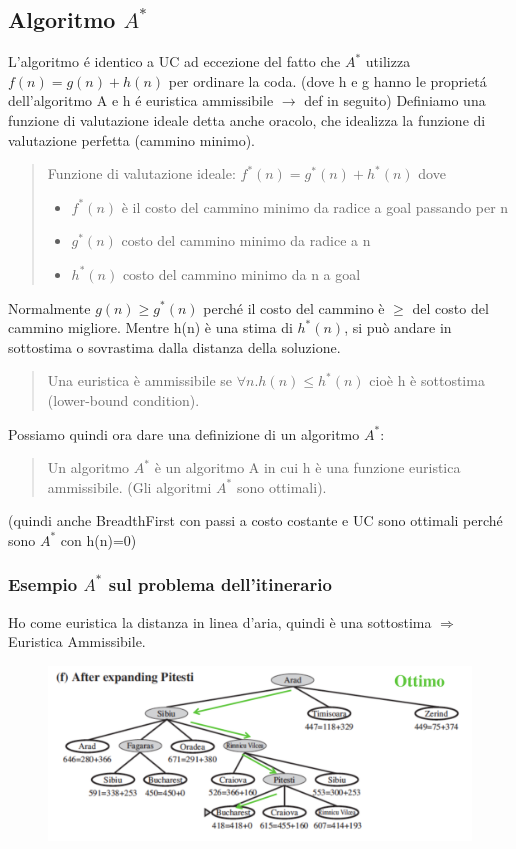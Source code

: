 \documentclass{article}
\begin{document}
\subsection{Algoritmo $A^*$}
L'algoritmo é identico a UC ad eccezione del fatto che $A^*$ utilizza $f(n)=g(n)+h(n)$ per ordinare la coda. (dove h e g hanno le proprietá dell'algoritmo A e h é euristica ammissibile $\rightarrow$ def in seguito)\newline
Definiamo una funzione di valutazione ideale detta anche oracolo, che idealizza la funzione di valutazione perfetta (cammino minimo).
\begin{quote}
    Funzione di valutazione ideale: $f^*(n) = g^*(n)+h^*(n)$ dove
    \begin{itemize}
        \item $f^*(n)$ è il costo del cammino minimo da radice a goal passando per n
        \item $g^*(n)$ costo del cammino minimo da radice a n
        \item $h^*(n)$ costo del cammino minimo da n a goal
    \end{itemize}
\end{quote}
Normalmente $g(n) \geq g^*(n)$ perché il costo del cammino è $\geq$ del costo del cammino migliore. Mentre h(n) è una stima di $h^*(n)$, si può andare in sottostima o sovrastima dalla distanza della soluzione.
\begin{quote}
    Una euristica è ammissibile se $\forall n . h(n) \leq h^*(n)$ cioè h è sottostima (lower-bound condition).
\end{quote}
Possiamo quindi ora dare una definizione di un algoritmo $A^*$:
\begin{quote}
    Un algoritmo $A^*$ è un algoritmo A in cui h è una funzione euristica ammissibile. (Gli algoritmi $A^*$ sono ottimali).
\end{quote}
(quindi anche BreadthFirst con passi a costo costante e UC sono ottimali perché sono $A^*$ con h(n)=0)

\subsubsection{Esempio $A^*$ sul problema dell'itinerario}
Ho come euristica la distanza in linea d'aria, quindi è una sottostima $\Rightarrow$ Euristica Ammissibile.
\begin{figure}[H]
    \centering
    \includegraphics[scale=0.6]{Images/itinerarioAstar.png}
\end{figure}
\end{document}
